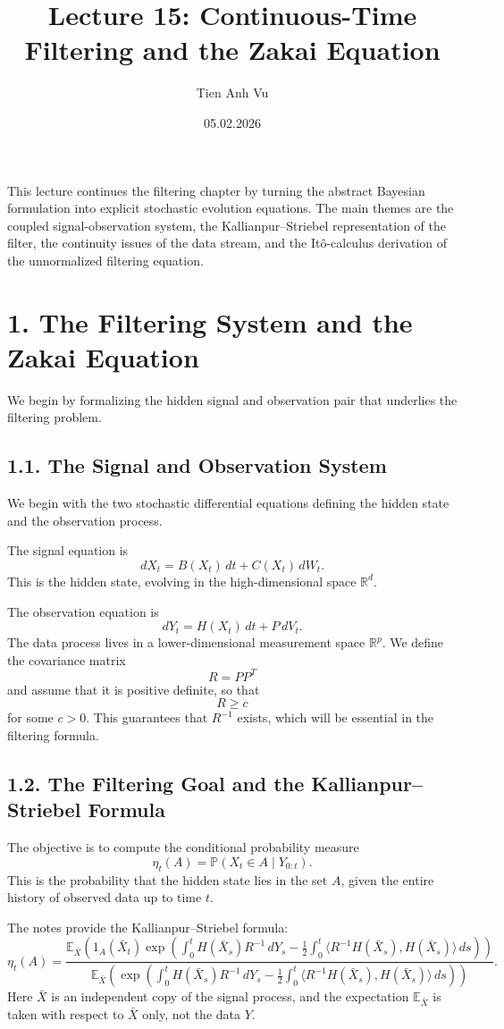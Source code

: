 \documentclass[11pt]{article}
\title{Lecture 15: Continuous-Time Filtering and the Zakai Equation}
\date{05.02.2026}
\author{Tien Anh Vu}
\theoremstyle{definition}
\theoremstyle{remark}
\begin{document}
\maketitle

This lecture continues the filtering chapter by turning the abstract Bayesian formulation into explicit stochastic evolution equations. The main themes are the coupled signal-observation system, the Kallianpur--Striebel representation of the filter, the continuity issues of the data stream, and the It\^o-calculus derivation of the unnormalized filtering equation.

\section*{1. The Filtering System and the Zakai Equation}
We begin by formalizing the hidden signal and observation pair that underlies the filtering problem.

\subsection*{1.1. The Signal and Observation System}
We begin with the two stochastic differential equations defining the hidden state and the observation process.

The signal equation is
\[
dX_t=B(X_t)\,dt+C(X_t)\,dW_t.
\]
This is the hidden state, evolving in the high-dimensional space \(\mathbb R^d\).

The observation equation is
\[
dY_t=H(X_t)\,dt+P\,dV_t.
\]
The data process lives in a lower-dimensional measurement space \(\mathbb R^p\). We define the covariance matrix
\[
R=PP^T
\]
and assume that it is positive definite, so that
\[
R\ge c
\]
for some \(c>0\). This guarantees that \(R^{-1}\) exists, which will be essential in the filtering formula.

\subsection*{1.2. The Filtering Goal and the Kallianpur--Striebel Formula}
The objective is to compute the conditional probability measure
\[
\eta_t(A)=\mathbb P(X_t\in A\mid Y_{0:t}).
\]
This is the probability that the hidden state lies in the set \(A\), given the entire history of observed data up to time \(t\).

The notes provide the Kallianpur--Striebel formula:
\[
\eta_t(A)
=
\frac{
\mathbb E_{\bar X}
\left(
1_A(\bar X_t)
\exp\left(
\int_0^t H(\bar X_s)R^{-1}\,dY_s
-\frac12\int_0^t \langle R^{-1}H(\bar X_s),H(\bar X_s)\rangle\,ds
\right)
\right)
}
{
\mathbb E_{\bar X}
\left(
\exp\left(
\int_0^t H(\bar X_s)R^{-1}\,dY_s
-\frac12\int_0^t \langle R^{-1}H(\bar X_s),H(\bar X_s)\rangle\,ds
\right)
\right)
}.
\]
Here \(\bar X\) is an independent copy of the signal process, and the expectation \(\mathbb E_{\bar X}\) is taken with respect to \(\bar X\) only, not the data \(Y\).
\end{document}
